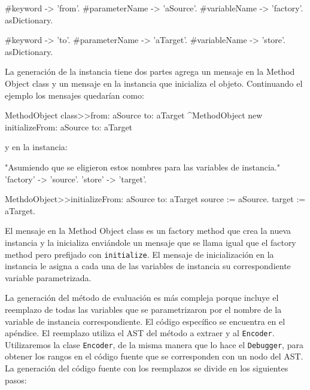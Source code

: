 \begin{code}
    {
        {
            #keyword -> 'from'.
            #parameterName -> 'aSource'.
            #variableName -> 'factory'.
        } asDictionary.

        {
            #keyword -> 'to'.
            #parameterName -> 'aTarget'.
            #variableName -> 'store'.
        } asDictionary.
    }
\end{code}

La generación de la instancia tiene dos partes agrega un mensaje en la Method Object class y un
mensaje en la instancia que inicializa el objeto. Continuando el ejemplo los mensajes quedarían como:

\begin{code}
MethodObject class>>from: aSource to: aTarget
    ^MethodObject new initializeFrom: aSource to: aTarget
\end{code}

y en la instancia:

\begin{code}
"Asumiendo que se eligieron estos nombres para las variables de instancia."
{
    'factory' -> 'source'.
    'store' -> 'target'.
}

MethdoObject>>initializeFrom: aSource to: aTarget
    source := aSource.
    target := aTarget.
\end{code}

El mensaje en la Method Object class es un factory method que crea la nueva instancia y la
inicializa enviándole un mensaje que se llama igual que el factory method pero prefijado con
\lstinline{initialize}. El mensaje de inicialización en la instancia le asigna a cada una de las
variables de instancia su correspondiente variable parametrizada.

La generación del método de evaluación es más compleja porque incluye el reemplazo de todas las
variables
que se parametrizaron por el nombre de la variable de instancia correspondiente. El código
específico se encuentra en el apéndice. El reemplazo utiliza el AST del método a extraer y al
\lstinline{Encoder}. Utilizaremos la clase \lstinline{Encoder}, de la misma manera que lo hace el
\lstinline{Debugger}, para obtener los rangos en el código fuente que se corresponden con un nodo
del AST. La generación del código fuente con los reemplazos se divide en los siguientes pasos:

